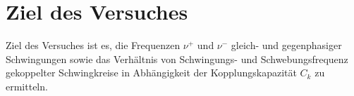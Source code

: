 \section{Ziel des Versuches}
\label{sec:ZieldesVersuches}
Ziel des Versuches ist es, die Frequenzen $ν^+$ und $ν^-$ gleich- und gegenphasiger Schwingungen sowie das Verhältnis von Schwingungs- und Schwebungsfrequenz
gekoppelter Schwingkreise in Abhängigkeit der Kopplungskapazität $C_k$ zu ermitteln. 